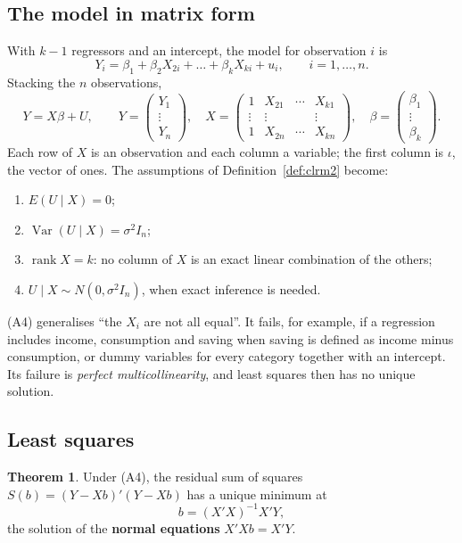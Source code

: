\documentclass[11pt,a4paper]{article}
\numberwithin{equation}{section}
\DeclareMathOperator{\Var}{Var}
\DeclareMathOperator{\rank}{rank}
\theoremstyle{definition}
\newtheorem{thm}{Theorem}[subsection]
\begin{document}
\subsection{The model in matrix form}
\label{ssec:matmodel}

With $k - 1$ regressors and an intercept, the model for observation $i$ is
\[
Y_i = \beta_1 + \beta_2X_{2i} + \dots + \beta_kX_{ki} + u_i, \qquad i = 1, \dots, n .
\]
Stacking the $n$ observations,
\[
Y = X\beta + U, \qquad
Y = \begin{pmatrix} Y_1 \\ \vdots \\ Y_n \end{pmatrix}, \quad
X = \begin{pmatrix} 1 & X_{21} & \cdots & X_{k1} \\ \vdots & \vdots & & \vdots \\ 1 & X_{2n} & \cdots & X_{kn} \end{pmatrix}, \quad
\beta = \begin{pmatrix} \beta_1 \\ \vdots \\ \beta_k \end{pmatrix} .
\]
Each row of $X$ is an observation and each column a variable; the first column is $\iota$, the vector of ones. The assumptions of
Definition~\ref{def:clrm2} become:
\begin{enumerate}[label=(A\arabic*)]
\item $E(U \mid X) = 0$;
\item[(A2--3)] $\Var(U \mid X) = \sigma^2I_n$;
\setcounter{enumi}{3}
\item $\rank X = k$: no column of $X$ is an exact linear combination of the others;
\item $U \mid X \sim N(0, \sigma^2I_n)$, when exact inference is needed.
\end{enumerate}
(A4) generalises ``the $X_i$ are not all equal''. It fails, for example, if a regression includes income, consumption and saving when saving is
defined as income minus consumption, or dummy variables for every category together with an intercept. Its failure is \emph{perfect
multicollinearity}, and least squares then has no unique solution.

\subsection{Least squares}
\label{ssec:lsk}

\begin{thm}
\label{thm:olsk}
Under (A4), the residual sum of squares $S(b) = (Y - Xb)'(Y - Xb)$ has a unique minimum at
\[
b = (X'X)^{-1}X'Y ,
\]
the solution of the \textbf{normal equations} $X'Xb = X'Y$.
\end{thm}
\end{document}
